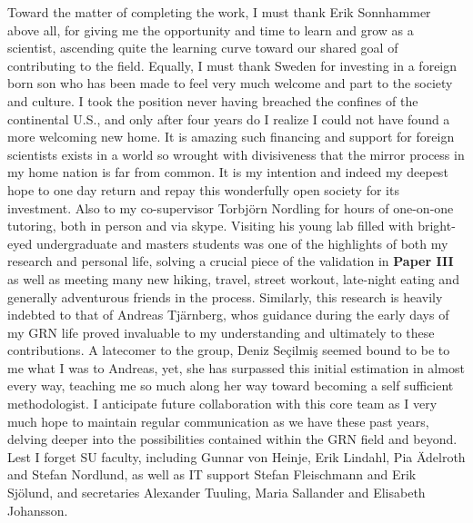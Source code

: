 Toward the matter of completing the work, I must thank Erik Sonnhammer above all, for giving me the opportunity and time to learn and grow as a scientist, ascending quite the learning curve toward our shared goal of contributing to the field. Equally, I must thank Sweden for investing in a foreign born son who has been made to feel very much welcome and part to the society and culture. I took the position never having breached the confines of the continental U.S., and only after four years do I realize I could not have found a more welcoming new home. It is amazing such financing and support for foreign scientists exists in a world so wrought with divisiveness that the mirror process in my home nation is far from common. It is my intention and indeed my deepest hope to one day return and repay this wonderfully open society for its investment. Also to my co-supervisor Torbj{\"o}rn Nordling for hours of one-on-one tutoring, both in person and via skype. Visiting his young lab filled with bright-eyed undergraduate and masters students was one of the highlights of both my research and personal life, solving a crucial piece of the validation in \textbf{Paper III} as well as meeting many new hiking, travel, street workout, late-night eating and generally adventurous friends in the process. Similarly, this research is heavily indebted to that of Andreas Tj{\"a}rnberg, whos guidance during the early days of my GRN life proved invaluable to my understanding and ultimately to these contributions. A latecomer to the group, Deniz Seçilmiş seemed bound to be to me what I was to Andreas, yet, she has surpassed this initial estimation in almost every way, teaching me so much along her way toward becoming a self sufficient methodologist. I anticipate future collaboration with this core team as I very much hope to maintain regular communication as we have these past years, delving deeper into the possibilities contained within the GRN field and beyond. Lest I forget SU faculty, including Gunnar von Heinje, Erik Lindahl, Pia {\"A}delroth and Stefan Nordlund, as well as IT support Stefan Fleischmann and Erik Sj{\"o}lund, and secretaries Alexander Tuuling, Maria Sallander and Elisabeth Johansson.
